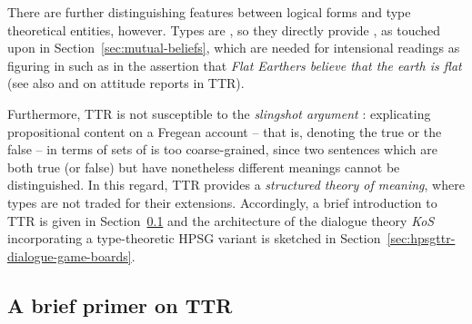 \documentclass[output=paper
 	        ,biblatex
                ,babelshorthands
                ,newtxmath
                ,draftmode
                ,colorlinks, citecolor=brown
]{langscibook}
\begin{document}
There are further distinguishing features between logical forms and type theoretical entities, however.
%
Types are , so they directly provide , as touched upon in Section~\ref{sec:mutual-beliefs}, which are needed for intensional readings as figuring in  such as in the assertion that \textit{Flat Earthers believe that the earth is flat} (see also \citealt{Cooper:2005:b} and \citealt{Cooper:ms} on attitude reports in TTR).


Furthermore, TTR is not susceptible to the \emph{slingshot argument} \citep[--26]{Barwise:Perry:1983}: explicating propositional content on a Fregean account \citep{Frege:1892} -- that is, denoting the true or the false -- in terms of sets of  is too coarse-grained, since two sentences which are both true (or false) but have nonetheless different meanings cannot be distinguished.
%
In this regard, TTR provides a \emph{structured theory of meaning}, where types are not traded for their extensions.
%
Accordingly, a brief introduction to TTR is given in Section~\ref{sec:brief-primer-ttr} and the architecture of the dialogue theory \emph{KoS} incorporating a type-theoretic HPSG variant is sketched in Section~\ref{sec:hpsgttr-dialogue-game-boards}.




\subsection{A brief primer on TTR}
\label{sec:brief-primer-ttr}
\end{document}
